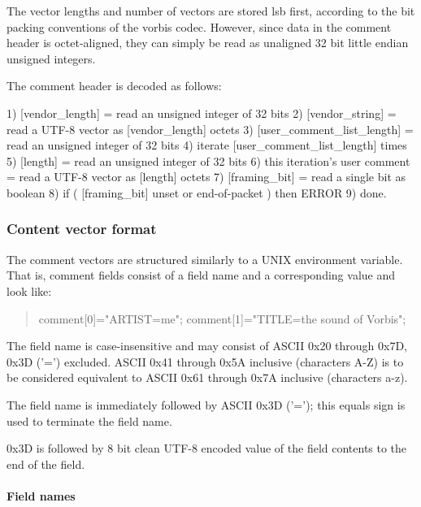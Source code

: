 The vector lengths and number of vectors are stored lsb first, according
to the bit packing conventions of the vorbis codec. However, since data
in the comment header is octet-aligned, they can simply be read as
unaligned 32 bit little endian unsigned integers.

The comment header is decoded as follows:

\begin{programlisting}
  1) [vendor\_length] = read an unsigned integer of 32 bits
  2) [vendor\_string] = read a UTF-8 vector as [vendor\_length] octets
  3) [user\_comment\_list\_length] = read an unsigned integer of 32 bits
  4) iterate [user\_comment\_list\_length] times {
       5) [length] = read an unsigned integer of 32 bits
       6) this iteration's user comment = read a UTF-8 vector as [length] octets
     }
  7) [framing\_bit] = read a single bit as boolean
  8) if ( [framing\_bit] unset or end-of-packet ) then ERROR
  9) done.
\end{programlisting}




\subsubsection{Content vector format}

The comment vectors are structured similarly to a UNIX environment variable.
That is, comment fields consist of a field name and a corresponding value and
look like:

\begin{quote}
\begin{programlisting}
comment[0]="ARTIST=me";
comment[1]="TITLE=the sound of Vorbis";
\end{programlisting}
\end{quote}

The field name is case-insensitive and may consist of ASCII 0x20
through 0x7D, 0x3D ('=') excluded. ASCII 0x41 through 0x5A inclusive
(characters A-Z) is to be considered equivalent to ASCII 0x61 through
0x7A inclusive (characters a-z).


The field name is immediately followed by ASCII 0x3D ('=');
this equals sign is used to terminate the field name.


0x3D is followed by 8 bit clean UTF-8 encoded value of the
field contents to the end of the field.


\paragraph{Field names}

